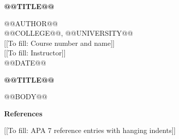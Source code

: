 \documentclass[12pt,letterpaper]{article}
\renewcommand{\missingfield}[1]{\textcolor{red!70!black}{[[To fill: #1]]}}
\begin{document}
\hypersetup{pageanchor=false}
\begin{titlepage}
  \thispagestyle{fancy}
  \vspace*{1.2in}
  \begin{center}
    {\bfseries @@TITLE@@\par}
    \vspace{1em}
    @@AUTHOR@@\\
    @@COLLEGE@@, @@UNIVERSITY@@\\
    \missingfield{Course number and name}\\
    \missingfield{Instructor}\\
    @@DATE@@
  \end{center}
\end{titlepage}
\hypersetup{pageanchor=true}

\begin{center}\textbf{@@TITLE@@}\end{center}
@@BODY@@

\newpage
\begin{center}\textbf{References}\end{center}
\noindent\missingfield{APA 7 reference entries with hanging indents}
\end{document}
